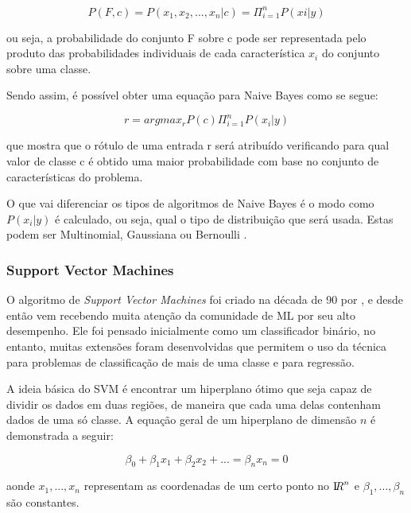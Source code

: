 \begin{equation}
\label{e.naive}
P(F,c)=P(x_{1},x_{2},...,x_{n}|c)=\Pi_{i=1}^n P(xi|y)
\end{equation}

ou seja, a probabilidade do conjunto F sobre c pode ser representada pelo produto das probabilidades individuais de cada característica $x_{i}$ do conjunto sobre uma classe.

Sendo assim, é possível obter uma equação para Naive Bayes como se segue:

\begin{equation}
\label{eq_final}
r = arg max_{r}P(c)\Pi_{i=1}^n P(x_{i}|y)
\end{equation}

que mostra que o rótulo de uma entrada r será atribuído verificando para qual valor de classe c é obtido uma maior probabilidade com base no conjunto de características do problema.

O que vai diferenciar os tipos de algoritmos de Naive Bayes é o modo como $ P(x_{i}|y)$ é calculado, ou seja, qual o tipo de distribuição que será usada. Estas podem ser Multinomial, Gaussiana ou Bernoulli \cite{Metsis06spamfiltering}. 

\subsubsection{Support Vector Machines}

O algoritmo de \textit{Support Vector Machines} foi criado na década de 90 por \cite{cortes1995support}, e desde então vem recebendo muita atenção da comunidade de ML por seu alto desempenho. Ele foi pensado inicialmente como um classificador binário, no entanto, muitas extensões foram desenvolvidas que permitem o uso da técnica para problemas de classificação de mais de uma classe e para regressão.

A ideia básica do SVM é encontrar um hiperplano ótimo que seja capaz de dividir os dados em duas regiões, de maneira que cada uma delas contenham dados de uma só classe. A equação geral de um hiperplano de dimensão $n$ é demonstrada a seguir:

\begin{equation}
\label{e.hyperplane}
\beta_{0} + \beta_{1}x_{1} + \beta_{2}x_{2} + ... = \beta_{n}x_{n} = 0
\end{equation}

aonde $x_{1},...,x_{n}$ representam as coordenadas de um certo ponto no ${\textrm I\!R}^{n}$ e $\beta_{1},...,\beta_{n}$ são constantes. 

